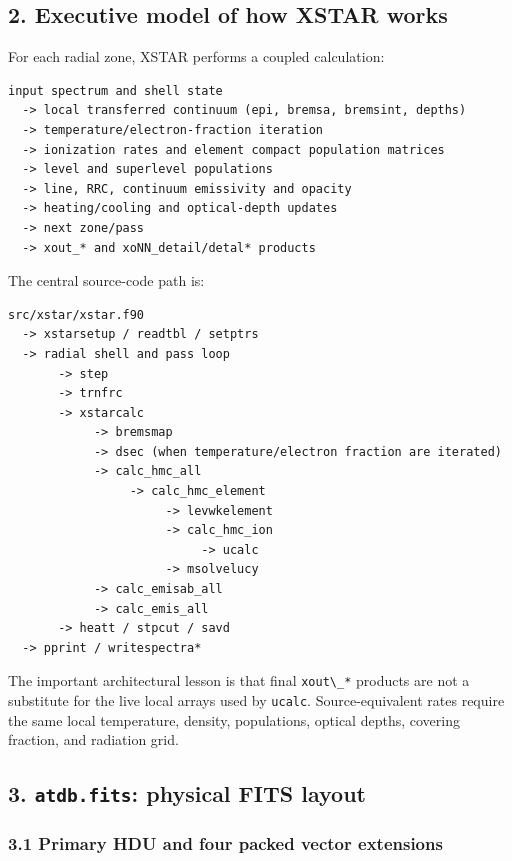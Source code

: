 \documentclass[
  10pt,
]{article}
\newcommand{\passthrough}[1]{#1}
\begin{document}
\subsection{2. Executive model of how XSTAR
works}\label{executive-model-of-how-xstar-works}

For each radial zone, XSTAR performs a coupled calculation:

\begin{lstlisting}
input spectrum and shell state
  -> local transferred continuum (epi, bremsa, bremsint, depths)
  -> temperature/electron-fraction iteration
  -> ionization rates and element compact population matrices
  -> level and superlevel populations
  -> line, RRC, continuum emissivity and opacity
  -> heating/cooling and optical-depth updates
  -> next zone/pass
  -> xout_* and xoNN_detail/detal* products
\end{lstlisting}

The central source-code path is:

\begin{lstlisting}
src/xstar/xstar.f90
  -> xstarsetup / readtbl / setptrs
  -> radial shell and pass loop
       -> step
       -> trnfrc
       -> xstarcalc
            -> bremsmap
            -> dsec (when temperature/electron fraction are iterated)
            -> calc_hmc_all
                 -> calc_hmc_element
                      -> levwkelement
                      -> calc_hmc_ion
                           -> ucalc
                      -> msolvelucy
            -> calc_emisab_all
            -> calc_emis_all
       -> heatt / stpcut / savd
  -> pprint / writespectra*
\end{lstlisting}

The important architectural lesson is that final
\passthrough{\lstinline!xout\_*!} products are not a substitute for the
live local arrays used by \passthrough{\lstinline!ucalc!}.
Source-equivalent rates require the same local temperature, density,
populations, optical depths, covering fraction, and radiation grid.

\subsection{\texorpdfstring{3. \texttt{atdb.fits}: physical FITS
layout}{3. atdb.fits: physical FITS layout}}\label{atdb.fits-physical-fits-layout}

\subsubsection{3.1 Primary HDU and four packed vector
extensions}\label{primary-hdu-and-four-packed-vector-extensions}
\end{document}
